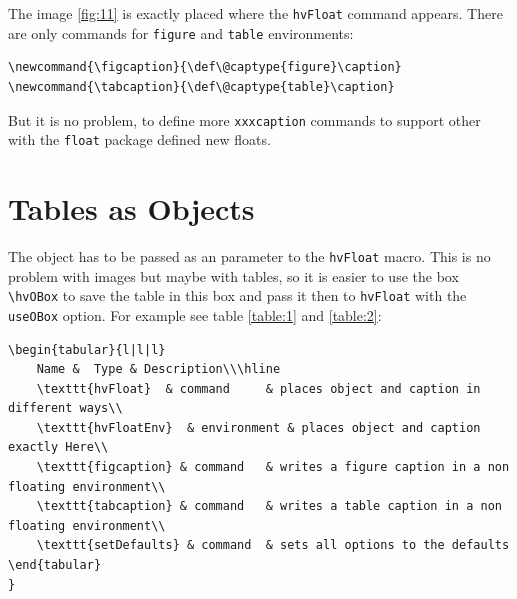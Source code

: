 \documentclass{scrartcl}
\begin{document}
\bigskip
The image \ref{fig:11} is exactly placed where the \texttt{hvFloat} command appears. There are only commands for \texttt{figure} and \texttt{table} environments:

\begin{lstlisting}
\newcommand{\figcaption}{\def\@captype{figure}\caption}
\newcommand{\tabcaption}{\def\@captype{table}\caption}
\end{lstlisting}

But it is no problem, to define more \texttt{xxxcaption} commands to support other with the \texttt{float} package defined new floats.

\section{Tables as Objects}\label{sec:tables}
The object has to be passed as an parameter to the \texttt{hvFloat} macro. This is no problem with images but maybe with tables, so it is easier to use the box \texttt{\textbackslash hvOBox} to save the table in this box and pass it then to \texttt{hvFloat} with the \texttt{useOBox} option. For example see table \ref{table:1} and \ref{table:2}:



\begin{lstlisting}[xrightmargin=-8em,xleftmargin=-3em]
\begin{tabular}{l|l|l}
	Name &	Type & Description\\\hline
	\texttt{hvFloat}  & command     & places object and caption in different ways\\
	\texttt{hvFloatEnv}  & environment & places object and caption exactly Here\\
	\texttt{figcaption} & command   & writes a figure caption in a non floating environment\\
	\texttt{tabcaption} & command   & writes a table caption in a non floating environment\\
	\texttt{setDefaults} & command  & sets all options to the defaults
\end{tabular}
}
\end{lstlisting}
\end{document}
